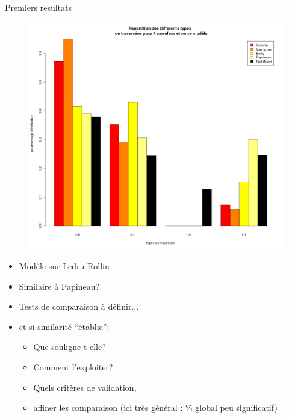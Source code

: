 \documentclass[hyperref={pdfpagelabel=false},8pt, handout=show,show notes]{beamer}
\begin{document}
\begin{frame}{Premiers resultats}

\begin{figure}
 \includegraphics[height=.60\textwidth]{images/BarplotMontrealMode}
\end{figure}
\begin{itemize}
 \item Mod\`ele sur Ledru-Rollin
 \item Similaire \`a Papineau?
 \item Tests de comparaison \`a d\'efinir...
 \item et si similarit\'e ``\'etablie'':
 \begin{itemize}
  \item Que souligne-t-elle?
  \item Comment l'exploiter?
  \item Quels crit\`eres de validation,
  \item affiner les comparaison (ici tr\`es g\'en\'eral : \% global peu significatif)
 \end{itemize}

\end{itemize}



\end{frame}

 
\end{document}
